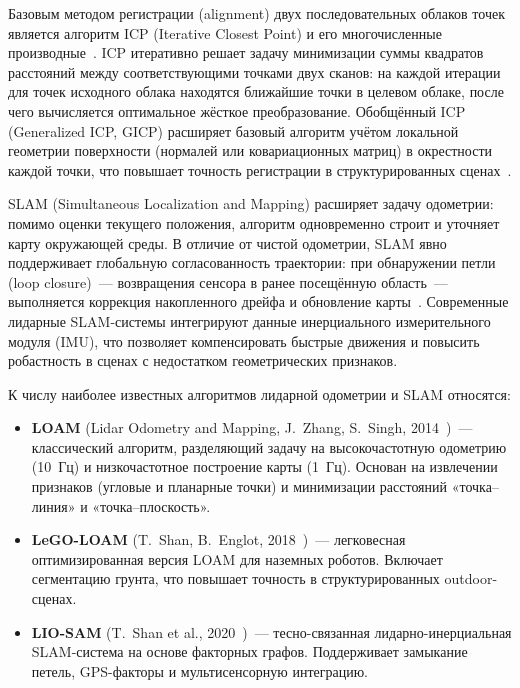 \documentclass{misisarticle}
\begin{document}
Базовым методом регистрации (alignment) двух последовательных облаков точек является алгоритм ICP (Iterative Closest Point) и его многочисленные производные~\cite{besl1992,segal2009}. ICP итеративно решает задачу минимизации суммы квадратов расстояний между соответствующими точками двух сканов: на каждой итерации для точек исходного облака находятся ближайшие точки в целевом облаке, после чего вычисляется оптимальное жёсткое преобразование. Обобщённый ICP (Generalized ICP, GICP) расширяет базовый алгоритм учётом локальной геометрии поверхности (нормалей или ковариационных матриц) в окрестности каждой точки, что повышает точность регистрации в структурированных сценах~\cite{segal2009}.

SLAM (Simultaneous Localization and Mapping) расширяет задачу одометрии: помимо оценки текущего положения, алгоритм одновременно строит и уточняет карту окружающей среды. В отличие от чистой одометрии, SLAM явно поддерживает глобальную согласованность траектории: при обнаружении петли (loop closure)~--- возвращения сенсора в ранее посещённую область~--- выполняется коррекция накопленного дрейфа и обновление карты~\cite{thrun2005,zhang2014}. Современные лидарные SLAM-системы интегрируют данные инерциального измерительного модуля (IMU), что позволяет компенсировать быстрые движения и повысить робастность в сценах с недостатком геометрических признаков.

К числу наиболее известных алгоритмов лидарной одометрии и SLAM относятся:
\begin{itemize}
  \item \textbf{LOAM} (Lidar Odometry and Mapping, J.~Zhang, S.~Singh, 2014~\cite{zhang2014})~--- классический алгоритм, разделяющий задачу на высокочастотную одометрию (10~Гц) и низкочастотное построение карты (1~Гц). Основан на извлечении признаков (угловые и планарные точки) и минимизации расстояний «точка--линия» и «точка--плоскость».
  \item \textbf{LeGO-LOAM} (T.~Shan, B.~Englot, 2018~\cite{shan2018})~--- легковесная оптимизированная версия LOAM для наземных роботов. Включает сегментацию грунта, что повышает точность в структурированных outdoor-сценах.
  \item \textbf{LIO-SAM} (T.~Shan et al., 2020~\cite{shan2020})~--- тесно-связанная лидарно-инерциальная SLAM-система на основе факторных графов. Поддерживает замыкание петель, GPS-факторы и мультисенсорную интеграцию.
\end{itemize}

\end{document}
